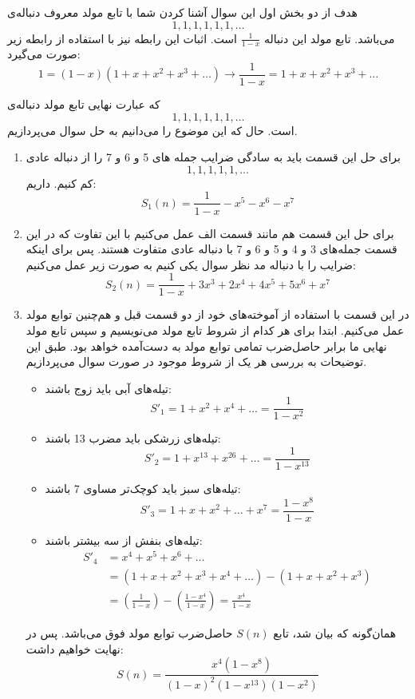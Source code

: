     \p
    هدف از دو بخش اول این سوال آشنا کردن شما با تابع مولد معروف دنباله‌ی 
        $${1,1,1,1,1,1,\ldots}$$
        می‌باشد.
        تابع مولد این دنباله $\frac{1}{1-x}$ است. اثبات این رابطه نیز با استفاده از رابطه زیر صورت می‌گیرد:
        $$1 = (1-x)(1+x+x^2+x^3+\ldots) \rightarrow \frac{1}{1-x} = 1+x+x^2+x^3+\ldots$$
        
        که عبارت نهایی تابع مولد دنباله‌ی 
        $${1,1,1,1,1,1,\ldots}$$
        است.
        حال که این موضوع را می‌دانیم به حل سوال می‌پردازیم.
        \begin{enumerate}
            \item 
            برای حل این قسمت باید به سادگی ضرایب جمله های 5 و 6 و 7 را از دنباله عادی
            $${1,1,1,1,1,\ldots}$$
            کم کنیم. داریم:
            $$S_{1}(n) = \frac{1}{1-x} - x^5 - x^6 - x^7$$
            \item
            برای حل این قسمت هم مانند قسمت الف عمل می‌کنیم با این تفاوت که در این قسمت جمله‌های 3 و 4 و 5 و 6 و 7 با دنباله عادی متفاوت هستند. پس برای اینکه ضرایب را با دنباله مد نظر سوال یکی کنیم به صورت زیر عمل می‌کنیم:
            $$S_{2}(n) = \frac{1}{1-x} + 3x^3 + 2x^4 + 4x^5 + 5x^6 + x^7$$
        \item
        در این قسمت با استفاده از آموخته‌های خود از دو قسمت قبل و هم‌چنین توابع مولد عمل می‌کنیم. ابتدا برای هر کدام از شروط تابع مولد می‌نویسیم و سپس تابع مولد نهایی ما برابر حاصل‌ضرب تمامی  توابع مولد  به دست‌آمده خواهد بود.
        طبق این توضیحات به بررسی هر یک از شروط موجود در صورت سوال می‌پردازیم.
        \begin{itemize}
            \item 
            تیله‌های آبی باید زوج باشند:
            $$S'_{1} = 1 + x^2 + x^4 + \ldots = \frac{1}{1-x^2}$$
            \item
            تیله‌های زرشکی باید مضرب 13 باشند:
            $$S'_{2} = 1 + x^{13} + x^{26} + \ldots = \frac{1}{1-x^{13}}$$
            \item
            تیله‌های سبز باید کوچک‌تر مساوی 7 باشند:
            $$S'_{3} = 1 + x + x^2 + \ldots + x^7 = \frac{1-x^8}{1-x}$$
            \item
            تیله‌های بنفش از سه بیشتر باشند:
            \begin{align*}
            S'_{4} &= x^4 + x^5 + x^6 + \ldots\\
            &= (1+x+x^2+x^3+x^4+\ldots) - (1 + x + x^2 + x^3)\\
            &= (\frac{1}{1-x}) - (\frac{1-x^4}{1-x}) = \frac{x^4}{1-x}
            \end{align*}
        \end{itemize}
        همان‌گونه که بیان شد، تابع 
        $S(n)$
        حاصل‌ضرب توابع مولد فوق می‌باشد. پس در نهایت خواهیم داشت:
        $$S(n) = \frac{x^4(1-x^8)}{(1-x)^2(1-x^{13})(1-x^{2})}$$
        \end{enumerate}